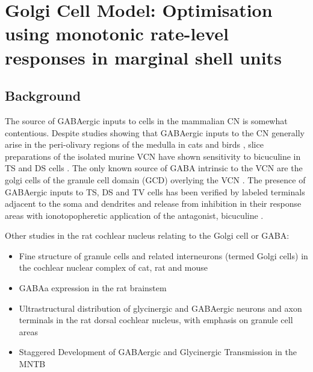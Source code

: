 

\graphicspath{{../figures/}{./gfx/}{/media/data/Work/cnstellate/golgi/}{/media/data/Work/Responses/}{/media/data/Work/cnstellate/Responses/}}

\section[Golgi Cell Model]{Golgi Cell Model: Optimisation using
  monotonic rate-level responses in marginal shell units}
\label{sec:GolgiCellModel}

\subsection{Background}

The source of GABAergic inputs to cells in the mammalian CN is
somewhat contentious. Despite studies showing that GABAergic inputs to
the CN generally arise in the peri-olivary regions of the medulla in
cats \citep{OstapoffBensonEtAl:1997} and birds
\citep{LachicaRubsamenEtAl:1995,YangMonsivaisEtAl:1999}, slice
preparations of the isolated murine VCN have shown sensitivity to
bicuculine in TS and DS cells \citep{FerragamoGoldingEtAl:1998a}.  The
only known source of GABA intrinsic to the VCN are the golgi cells of
the granule cell domain (GCD) overlying the VCN
\citep[Fig.~\ref{fig:CNdiagram}]{Mugnaini:1985,FerragamoGoldingEtAl:1998}.
The presence of GABAergic inputs to TS, DS and TV cells has been
verified by labeled terminals adjacent to the soma and dendrites
\citep{SmithRhode:1989,AwatramaniTurecekEtAl:2005,BabalianRyugoEtAl:2003}
and release from inhibition in their response areas with
ionotopopheretic application of the \GABAa antagonist, bicuculine
\citep{EvansZhao:1998,CasparyBackoffEtAl:1994,BackoffShadduckEtAl:1999,FerragamoGoldingEtAl:1998a}.

\medskip{}

Other studies in the rat cochlear nucleus relating to the Golgi cell or GABA:
\begin{itemize}
\item \citep{MugnainiOsenEtAl:1980} Fine structure of granule cells
  and related interneurons (termed {Golgi} cells) in the cochlear
  nuclear complex of cat, rat and mouse
\item GABAa expression in the rat brainstem  \citep{CamposCaboEtAl:2001}
\item \citep{Alibardi:2003a} Ultrastructural distribution of
  glycinergic and {{GABAergic}} neurons and axon terminals in the rat
  dorsal cochlear nucleus, with emphasis on granule cell areas
\item \citep{AwatramaniTurecekEtAl:2005} Staggered {Development} of
  {GABAergic} and {Glycinergic} {Transmission} in the {MNTB}
\end{itemize}

